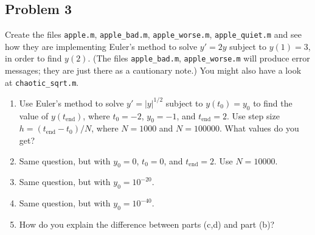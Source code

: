 \documentclass{article}
\begin{document}
\subsection*{Problem 3}
Create the files \verb|apple.m|, \verb|apple_bad.m|, \verb|apple_worse.m|,
\verb|apple_quiet.m| and see how they are implementing Euler's method
to solve $y' = 2y$ subject to $y(1) = 3$, in order to find $y(2)$.
(The files \verb|apple_bad.m|, \verb|apple_worse.m| will produce error messages;
they are just there as a cautionary note.)
You might also have a look at \verb|chaotic_sqrt.m|.
\begin{enumerate}
	\item Use Euler's method to solve $y' = \lvert y \rvert^{1/2}$
		subject to $y(t_0) = y_0$ to find the value of $y(t_{\mathrm{end}})$,
		where $t_0 = -2$, $y_0 = -1$, and $t_{\mathrm{end}} = 2$.
		Use step size $h = (t_{\mathrm{end}} - t_0)/N$,
		where $N = 1000$ and $N = 100000$.
		What values do you get?
	\item Same question, but with $y_0 = 0$, $t_0 = 0$, and $t_{\mathrm{end}} = 2$.
		Use $N = 10000$.
	\item Same question, but with $y_0 = 10^{-20}$.
	\item Same question, but with $y_0 = 10^{-40}$.
	\item How do you explain the difference between parts (c,d) and part (b)?
\end{enumerate}
\end{document}

